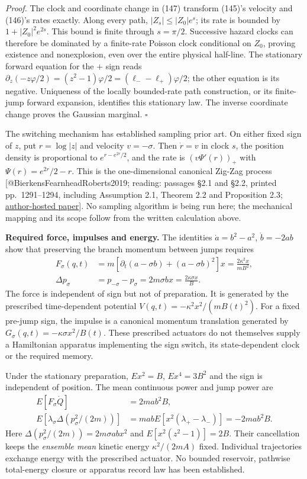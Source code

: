 \documentclass[11pt,a4paper]{article}
\begin{document}
\emph{Proof.} The clock and coordinate change in (147) transform (145)'s
velocity and (146)'s rates exactly. Along every path,
\(|Z_s|\le |Z_0|e^s\); its rate is bounded by \(1+|Z_0|^2e^{2s}\). This
bound is finite through \(s=\pi/2\). Successive hazard clocks can
therefore be dominated by a finite-rate Poisson clock conditional on
\(Z_0\), proving existence and nonexplosion, even over the entire
physical half-line. The stationary forward equation for the \(+\) sign
reads
\(\partial_z(-z\varphi/2)=(z^2-1)\varphi/2 =(\ell_--\ell_+)\varphi/2\);
the other equation is its negative. Uniqueness of the locally
bounded-rate path construction, or its finite-jump forward expansion,
identifies this stationary law. The inverse coordinate change proves the
Gaussian marginal. \(\square\)

The switching mechanism has established sampling prior art. On either
fixed sign of \(z\), put \(r=\log|z|\) and velocity \(v=-\sigma\). Then
\(\dot r=v\) in clock \(s\), the position density is proportional to
\(e^{r-e^{2r}/2}\), and the rate is \((v\Psi'(r))_+\) with
\(\Psi(r)=e^{2r}/2-r\). This is the one-dimensional canonical Zig-Zag
process {[}@BierkensFearnheadRoberts2019; reading: passages §2.1 and
§2.2, printed pp.~1291--1294, including Assumption 2.1, Theorem 2.2 and
Proposition 2.3;
\href{https://diamhomes.ewi.tudelft.nl/~jorisbierkens/pubs/AOS1715.pdf}{author-hosted
paper}{]}. No sampling algorithm is being run here; the mechanical
mapping and its scope follow from the written calculation above.

\textbf{Required force, impulses and energy.} The identities
\(\dot a=b^2-a^2\), \(\dot b=-2ab\) show that preserving the branch
momentum between jumps requires \[\begin{aligned}
F_\sigma(q,t)&=m[\partial_t(a-\sigma b)+(a-\sigma b)^2]x
 =\frac{2\kappa^2 x}{mB^2},\\
\Delta p_\sigma&=p_{-\sigma}-p_\sigma
 =2m\sigma bx=\frac{2\kappa\sigma x}{B}.
\end{aligned}\tag{148}\] The force is independent of sign but not of
preparation. It is generated by the prescribed time-dependent potential
\(V(q,t)=-\kappa^2x^2/(mB(t)^2)\). For a fixed pre-jump sign, the
impulse is a canonical momentum translation generated by
\(G_\sigma(q,t)=-\kappa\sigma x^2/B(t)\). These prescribed actuators do
not themselves supply a Hamiltonian apparatus implementing the sign
switch, its state-dependent clock or the required memory.

Under the stationary preparation, \(E x^2=B\), \(E x^4=3B^2\) and the
sign is independent of position. The mean continuous power and jump
power are \[\begin{aligned}
E[F_\sigma\dot Q]&=2mab^2B,\\
E[\lambda_\sigma\Delta(p_\sigma^2/(2m))]
 &=mab E[x^2(\lambda_+-\lambda_-)]
 =-2mab^2B.
\end{aligned}\tag{149}\] Here \(\Delta(p_\sigma^2/(2m))=2m\sigma abx^2\)
and \(E[x^2(z^2-1)]=2B\). Their cancellation keeps the \emph{ensemble
mean} kinetic energy \(\kappa^2/(2mA)\) fixed. Individual trajectories
exchange energy with the prescribed actuator. No bounded reservoir,
pathwise total-energy closure or apparatus record law has been
established.
\end{document}
